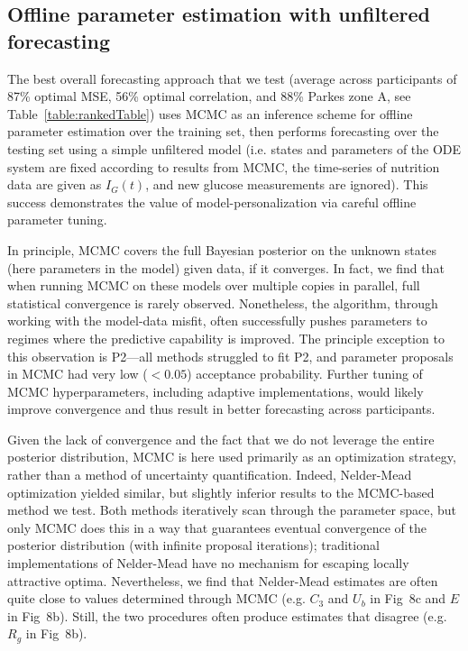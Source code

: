 \documentclass[10pt,letterpaper]{article}
\begin{document}
\subsection{Offline parameter estimation with unfiltered forecasting}
The best overall forecasting approach that we test (average across participants of 87\% optimal MSE, 56\% optimal correlation, and 88\% Parkes zone A, see Table~\ref{table:rankedTable}) uses MCMC as an inference scheme for offline parameter estimation over the training set, then performs forecasting over the testing set using a simple unfiltered model (i.e. states and parameters of the ODE system are fixed according to results from MCMC, the time-series of nutrition data are given as $I_G(t)$, and new glucose measurements are ignored). This success demonstrates the value of model-personalization via careful offline parameter tuning.

In principle, MCMC covers the full Bayesian posterior on the unknown states (here parameters in the model) given data, if it converges. 
In fact, we find that when running MCMC on these models over multiple copies in parallel, full statistical convergence is rarely observed. Nonetheless, the algorithm, through working with the model-data misfit, often successfully pushes parameters to regimes where the predictive capability is improved. 
The principle exception to this observation is P2---all methods struggled to fit P2, and parameter proposals in MCMC had very low ($< 0.05$) acceptance probability.
Further tuning of MCMC hyperparameters, including adaptive implementations, would likely improve convergence and thus result in better forecasting across participants.


Given the lack of convergence and the fact that we do not leverage the entire posterior distribution, MCMC is here used primarily as an optimization strategy, rather than a method of uncertainty quantification. Indeed, Nelder-Mead optimization yielded similar, but slightly inferior results to the MCMC-based method we test. Both methods iteratively scan through the parameter space, but only MCMC does this in a way that guarantees eventual convergence of the posterior distribution (with infinite proposal iterations); traditional implementations of Nelder-Mead have no mechanism for escaping locally attractive optima. 
Nevertheless, we find that Nelder-Mead estimates are often quite close to values determined through MCMC (e.g. $C_3$ and $U_b$ in Fig~8c and $E$ in Fig~8b). Still, the two procedures often produce estimates that disagree (e.g. $R_g$ in Fig~8b).
\end{document}
